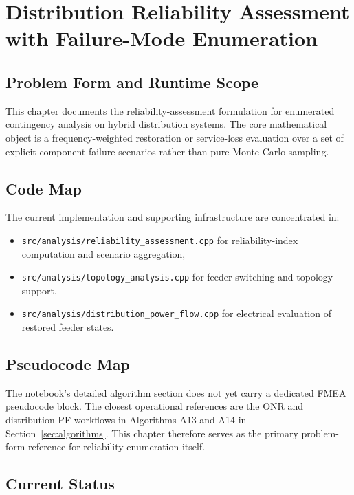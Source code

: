 \section{Distribution Reliability Assessment with Failure-Mode Enumeration}
\label{sec:distribution-reliability-fmea}

\subsection{Problem Form and Runtime Scope}

This chapter documents the reliability-assessment formulation for enumerated
contingency analysis on hybrid distribution systems.  The core mathematical
object is a frequency-weighted restoration or service-loss evaluation over a set
of explicit component-failure scenarios rather than pure Monte Carlo sampling.

\subsection{Code Map}

The current implementation and supporting infrastructure are concentrated in:
\begin{itemize}
  \item \texttt{src/analysis/reliability\_assessment.cpp} for reliability-index computation and scenario aggregation,
  \item \texttt{src/analysis/topology\_analysis.cpp} for feeder switching and topology support,
  \item \texttt{src/analysis/distribution\_power\_flow.cpp} for electrical evaluation of restored feeder states.
\end{itemize}

\subsection{Pseudocode Map}

The notebook's detailed algorithm section does not yet carry a dedicated FMEA
pseudocode block.  The closest operational references are the ONR and
distribution-PF workflows in Algorithms A13 and A14 in
Section~\ref{sec:algorithms}.  This chapter therefore serves as the primary
problem-form reference for reliability enumeration itself.

\subsection{Current Status}

